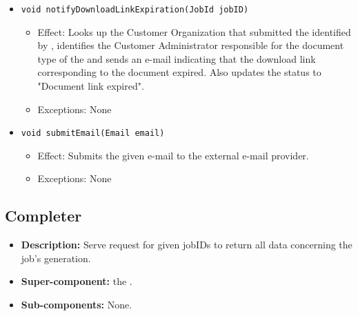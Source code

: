 \begin{itemize}
\begin{itemize}
		\item \texttt{void notifyDownloadLinkExpiration(JobId jobID)}
		    \begin{itemize}
                \item Effect: Looks up the Customer Organization that submitted the  identified by , identifies the Customer Administrator responsible for the document type of the  and sends an e-mail indicating that the download link corresponding to the document expired. Also updates the status to "Document link expired".
                \item Exceptions: None
            \end{itemize}

		\item \texttt{void submitEmail(Email email)}
        \begin{itemize}
            \item Effect: Submits the given e-mail to the external e-mail provider.
            \item Exceptions: None
        \end{itemize}
    \end{itemize}
\end{itemize}

\subsection{Completer}
\begin{itemize}
    \item \textbf{Description:} Serve request for given jobIDs to return all data concerning the job's generation.
    \item \textbf{Super-component:} the .
    \item \textbf{Sub-components:} None.
\end{itemize}

